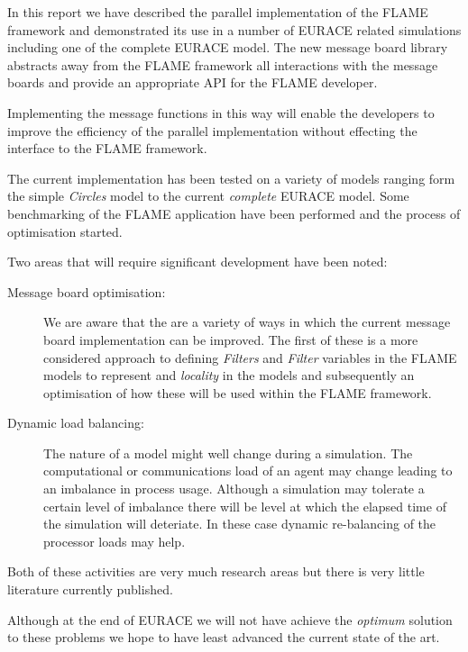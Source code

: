 In this report we have described the parallel implementation of the FLAME framework and
demonstrated its use in a number of EURACE related simulations including one of the complete EURACE model. The new message board library abstracts away from the FLAME framework all interactions with the message boards and provide an appropriate API for the FLAME developer.

Implementing the message functions in this way will enable the developers to improve the  efficiency of the parallel implementation without effecting the interface to the FLAME framework.

The current implementation has been tested on a variety of models ranging form the simple \textsl{Circles} model to the current \textsl{complete} EURACE model. Some benchmarking of the FLAME application have been performed and the process of optimisation started.

Two areas that will require significant development have been noted:
\begin{description}
	\item [Message board optimisation:] We are aware that the are a variety of ways in which the current message board implementation can be improved. The first of these is a more considered approach to defining \textsl{Filters} and \textsl{Filter} variables in the FLAME models to represent and \textsl{locality} in the models and subsequently an optimisation of how these will be used within the FLAME framework.
 \item [Dynamic load balancing:] The nature of a model might well change during a simulation. The computational or communications load of an agent may change leading to an imbalance in process usage. Although a simulation may tolerate a certain level of imbalance there will be level at which the elapsed time of the simulation will deteriate. In these case dynamic re-balancing of the processor loads may help.
 \end{description}
Both of these activities are very much research areas but there is very little literature currently published.

Although at the end of EURACE we will not have achieve the \textsl{optimum} solution to these problems we hope to have least advanced the current state of the art.